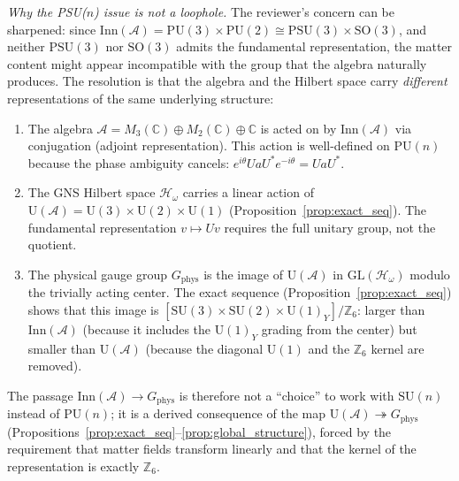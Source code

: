 \documentclass[11pt,a4paper]{article}
\theoremstyle{definition}
\newcommand{\SU}{\mathrm{SU}}
\newcommand{\U}{\mathrm{U}}
\begin{document}
\noindent\textit{Why the PSU($n$) issue is not a loophole.}\quad
The reviewer's concern can be sharpened: since $\mathrm{Inn}(\mathcal{A})
= \mathrm{PU}(3) \times \mathrm{PU}(2) \cong \mathrm{PSU}(3) \times
\mathrm{SO}(3)$, and neither $\mathrm{PSU}(3)$ nor $\mathrm{SO}(3)$
admits the fundamental representation, the matter content might appear
incompatible with the group that the algebra naturally produces.  The
resolution is that the algebra and the Hilbert space carry
\emph{different} representations of the same underlying structure:
\begin{enumerate}[label=(\alph*),nosep]
  \item The algebra $\mathcal{A} = M_3(\mathbb{C}) \oplus
  M_2(\mathbb{C}) \oplus \mathbb{C}$ is acted on by
  $\mathrm{Inn}(\mathcal{A})$ via conjugation (adjoint
  representation).  This action is well-defined on
  $\mathrm{PU}(n)$ because the phase ambiguity cancels:
  $e^{i\theta} U a U^* e^{-i\theta} = UaU^*$.
  \item The GNS Hilbert space $\mathcal{H}_\omega$ carries a linear
  action of $\mathrm{U}(\mathcal{A}) = \mathrm{U}(3) \times
  \mathrm{U}(2) \times \mathrm{U}(1)$
  (Proposition~\ref{prop:exact_seq}).  The fundamental representation
  $v \mapsto Uv$ requires the full unitary group, not the quotient.
  \item The physical gauge group $G_{\mathrm{phys}}$ is the image of
  $\mathrm{U}(\mathcal{A})$ in $\mathrm{GL}(\mathcal{H}_\omega)$
  modulo the trivially acting center.  The exact sequence
  (Proposition~\ref{prop:exact_seq}) shows that this image is
  $[\SU(3) \times \SU(2) \times \U(1)_Y] / \mathbb{Z}_6$:
  larger than $\mathrm{Inn}(\mathcal{A})$ (because it includes the
  $\U(1)_Y$ grading from the center) but smaller than
  $\mathrm{U}(\mathcal{A})$ (because the diagonal $\mathrm{U}(1)$
  and the $\mathbb{Z}_6$ kernel are removed).
\end{enumerate}
The passage $\mathrm{Inn}(\mathcal{A}) \to G_{\mathrm{phys}}$ is
therefore not a ``choice'' to work with $\SU(n)$ instead of
$\mathrm{PU}(n)$; it is a derived consequence of the map
$\mathrm{U}(\mathcal{A}) \twoheadrightarrow G_{\mathrm{phys}}$
(Propositions~\ref{prop:exact_seq}--\ref{prop:global_structure}),
forced by the requirement that matter fields transform linearly
and that the kernel of the representation is exactly
$\mathbb{Z}_6$.
\end{document}
